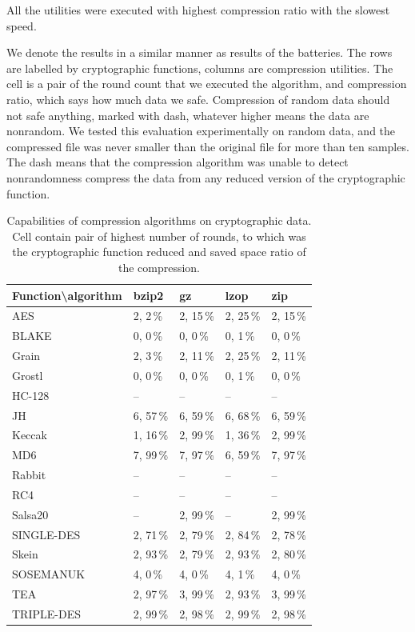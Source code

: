 \documentclass[
  print, %
  Table,   %
  nolof,     %
  nolot,     %
  11pt, %
  oneside  %
]{fithesis3}
\begin{document}
All the utilities were executed with highest compression ratio with the slowest speed.

We denote the results in a similar manner as results of the batteries. The rows are labelled by cryptographic functions, columns are compression utilities. The cell is a pair of the round count that we executed the algorithm, and compression ratio, which says how much data we safe. Compression of random data should not safe anything, marked with dash, whatever higher means the data are nonrandom. We tested this evaluation experimentally on random data, and the compressed file was never smaller than the original file for more than ten samples. The dash means that the compression algorithm was unable to detect nonrandomness compress the data from any reduced version of the cryptographic function.

\begin{table}[H]
\centering{}
\begin{tabular}{l|p{1.8cm} p{1.8cm} p{1.8cm} p{1.8cm}}
Function\textbackslash{}algorithm & 
                bzip2   &   gz      &   lzop    &   zip     \\ \hline
AES         & 2, 2\,\%  & 2, 15\,\% & 2, 25\,\% & 2, 15\,\% \\
BLAKE       & 0, 0\,\%  & 0, 0\,\%  & 0, 1\,\%  & 0, 0\,\%  \\
Grain       & 2, 3\,\%  & 2, 11\,\% & 2, 25\,\% & 2, 11\,\% \\
Grostl      & 0, 0\,\%  & 0, 0\,\%  & 0, 1\,\%  & 0, 0\,\%  \\
HC-128      & --        & --        & --        & --        \\
JH          & 6, 57\,\% & 6, 59\,\% & 6, 68\,\% & 6, 59\,\% \\
Keccak      & 1, 16\,\% & 2, 99\,\% & 1, 36\,\% & 2, 99\,\% \\
MD6         & 7, 99\,\% & 7, 97\,\% & 6, 59\,\% & 7, 97\,\% \\
Rabbit      & --        & --        & --        & --        \\
RC4         & --        & --        & --        & --        \\
Salsa20     & --        & 2, 99\,\% & --        & 2, 99\,\% \\
SINGLE-DES  & 2, 71\,\% & 2, 79\,\% & 2, 84\,\% & 2, 78\,\% \\
Skein       & 2, 93\,\% & 2, 79\,\% & 2, 93\,\% & 2, 80\,\% \\
SOSEMANUK   & 4, 0\,\%  & 4, 0\,\%  & 4, 1\,\%  & 4, 0\,\%  \\
TEA         & 2, 97\,\% & 3, 99\,\% & 2, 93\,\% & 3, 99\,\% \\
TRIPLE-DES  & 2, 99\,\% & 2, 98\,\% & 2, 99\,\% & 2, 98\,\% 

\end{tabular}
\caption{Capabilities of compression algorithms on cryptographic data. Cell contain pair of highest number of rounds, to which was the cryptographic function reduced and saved space ratio of the compression.}
\label{table:res-compression}
\end{table}
\end{document}

